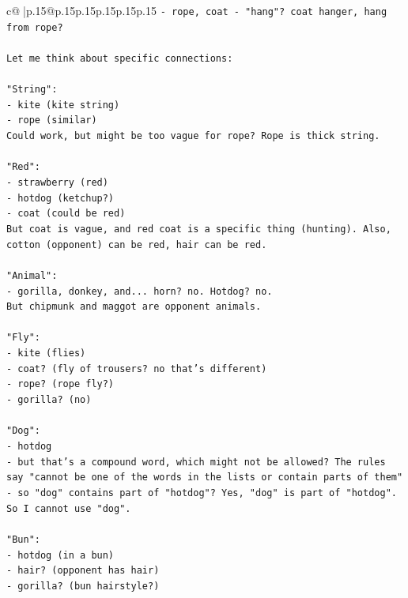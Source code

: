 \documentclass{article}
\begin{document}
{\begin{supertabular}{c@{$\;$}|p{.15\linewidth}@{}p{.15\linewidth}p{.15\linewidth}p{.15\linewidth}p{.15\linewidth}p{.15\linewidth}}
{{{\texttt{{-} rope, coat {-} "hang"? coat hanger, hang from rope?} \\
\\ 
\texttt{Let me think about specific connections:} \\
\\ 
\texttt{"String":} \\
\texttt{{-} kite (kite string)} \\
\texttt{{-} rope (similar)} \\
\texttt{Could work, but might be too vague for rope? Rope is thick string.} \\
\\ 
\texttt{"Red":} \\
\texttt{{-} strawberry (red)} \\
\texttt{{-} hotdog (ketchup?)} \\
\texttt{{-} coat (could be red)} \\
\texttt{But coat is vague, and red coat is a specific thing (hunting). Also, cotton (opponent) can be red, hair can be red.} \\
\\ 
\texttt{"Animal":} \\
\texttt{{-} gorilla, donkey, and... horn? no. Hotdog? no.} \\
\texttt{But chipmunk and maggot are opponent animals.} \\
\\ 
\texttt{"Fly":} \\
\texttt{{-} kite (flies)} \\
\texttt{{-} coat? (fly of trousers? no that's different)} \\
\texttt{{-} rope? (rope fly?)} \\
\texttt{{-} gorilla? (no)} \\
\\ 
\texttt{"Dog":} \\
\texttt{{-} hotdog} \\
\texttt{{-} but that's a compound word, which might not be allowed? The rules say "cannot be one of the words in the lists or contain parts of them" {-} so "dog" contains part of "hotdog"? Yes, "dog" is part of "hotdog". So I cannot use "dog".} \\
\\ 
\texttt{"Bun":} \\
\texttt{{-} hotdog (in a bun)} \\
\texttt{{-} hair? (opponent has hair)} \\
\texttt{{-} gorilla? (bun hairstyle?)} \\
}}}
\end{supertabular}}
\end{document}

